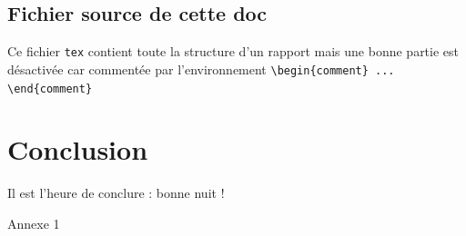 \documentclass{themeensg}
\begin{document}
\section{Fichier source de cette doc}
Ce fichier \texttt{tex} contient toute la structure d'un rapport mais une bonne partie est désactivée car commentée par l'environnement \verb!\begin{comment} ... \end{comment}!


\newevenpage
\chapter*{Conclusion}
  \vspace{1.5cm}
Il est l'heure de conclure : bonne nuit !


\newevenpage
\nocite{*}



\newevenpage
\begin{appendices} 
\label{beginappendices}
\label{annexekalman}
Annexe 1

\end{appendices} 
\end{document}
